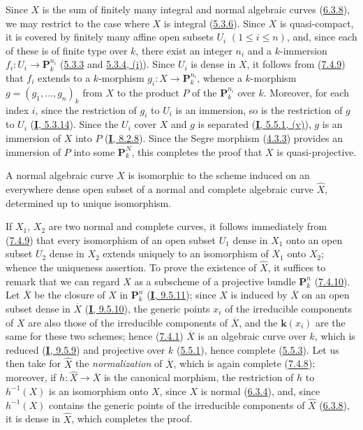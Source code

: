 Since $X$ is the sum of finitely many integral and normal algebraic curves
(\hyperref[II.6.3.8]{6.3.8}), we may restrict to the case where $X$ is
integral (\hyperref[II.5.3.6]{5.3.6}). Since $X$ is quasi-compact, it is
covered by finitely many affine open subsets $U_i$ $(1\leq i\leq n)$, and,
since each of these is of finite type over $k$, there exist an integer
$n_i$ and a $k$-immersion $f_i:U_i\to\mathbf{P}_k^{n_i}$
(\hyperref[II.5.3.3]{5.3.3} and
\hyperref[II.5.3.4]{5.3.4, (i)}). Since $U_i$ is dense in $X$, it follows
from (\hyperref[II.7.4.9]{7.4.9}) that $f_i$ extends to a $k$-morphism
$g_i:X\to\mathbf{P}_k^{n_i}$, whence a $k$-morphism
$g=(g_1,\ldots,g_n)_k$ from $X$ to the product $P$ of the
$\mathbf{P}_k^{n_i}$ over $k$. Moreover, for each index $i$, since the
restriction of $g_i$ to $U_i$ is an immersion, so is the restriction of $g$ to
$U_i$ (\hyperref[I.5.3.14]{\textbf{I}, 5.3.14}). Since the
$U_i$ cover $X$ and $g$ is separated
(\hyperref[I.5.5.1]{\textbf{I}, 5.5.1, (v)}), $g$ is an immersion of $X$ into $P$
(\hyperref[I.8.2.8]{\textbf{I}, 8.2.8}). Since the Segre morphism
(\hyperref[II.4.3.3]{4.3.3}) provides an immersion of $P$ into some
$\mathbf{P}_k^N$, this completes the proof that $X$ is quasi-projective.

\begin{corollary}[7.4.11]
\label{II.7.4.11}
A normal algebraic curve $X$ is isomorphic to the scheme induced on an
everywhere dense open subset of a normal and complete algebraic curve
$\widehat{X}$, determined up to unique isomorphism.
\end{corollary}

If $X_1$, $X_2$ are two normal and complete curves, it follows immediately
from (\hyperref[II.7.4.9]{7.4.9}) that every isomorphism of an open subset
$U_1$ dense in $X_1$ onto an open subset $U_2$ dense in $X_2$ extends uniquely
to an isomorphism of $X_1$ onto $X_2$; whence the uniqueness assertion. To
prove the existence of $\widehat{X}$, it suffices to remark that we can
regard $X$ as a subscheme of a projective bundle $\mathbf{P}_k^n$
(\hyperref[II.7.4.10]{7.4.10}). Let $\overline{X}$ be the closure of $X$ in
$\mathbf{P}_k^n$ (\hyperref[I.9.5.11]{\textbf{I}, 9.5.11}); since $X$ is induced
by $\overline{X}$ on an open subset dense in $\overline{X}$
(\hyperref[I.9.5.10]{\textbf{I}, 9.5.10}), the generic points $x_i$ of the
irreducible components of $X$ are also those of the irreducible components
of $\overline{X}$, and the $\boldsymbol{k}(x_i)$ are the same for these two schemes; hence
(\hyperref[II.7.4.1]{7.4.1}) $\overline{X}$ is an algebraic curve over
$k$, which is reduced (\hyperref[I.9.5.9]{\textbf{I}, 9.5.9}) and projective over $k$
(\hyperref[II.5.5.1]{5.5.1}), hence complete
(\hyperref[II.5.5.3]{5.5.3}). Let us then take for $\widehat{X}$ the
\emph{normalization} of $\overline{X}$, which is again complete
(\hyperref[II.7.4.8]{7.4.8}); moreover, if
$h:\widehat{X}\to\overline{X}$ is the canonical morphism, the restriction of
$h$ to $h^{-1}(X)$ is an isomorphism onto $X$, since $X$ is normal
(\hyperref[II.6.3.4]{6.3.4}), and, since $h^{-1}(X)$ contains the generic
points of the irreducible components of $\widehat{X}$
(\hyperref[II.6.3.8]{6.3.8}), it is dense in $\widehat{X}$, which completes
the proof.

